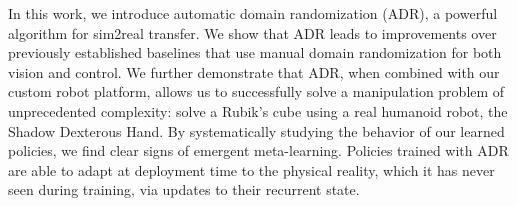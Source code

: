 In this work, we introduce automatic domain randomization (ADR), a powerful algorithm for sim2real transfer. We show that ADR leads to improvements over previously established baselines that use manual domain randomization for both vision and control. We further demonstrate that ADR, when combined with our custom robot platform, allows us to successfully solve a manipulation problem of unprecedented complexity: solve a Rubik's cube using a real humanoid robot, the Shadow Dexterous Hand. By systematically studying the behavior of our learned policies, we find clear signs of emergent meta-learning. Policies trained with ADR are able to adapt at deployment time to the physical reality, which it has never seen during training, via updates to their recurrent state.
